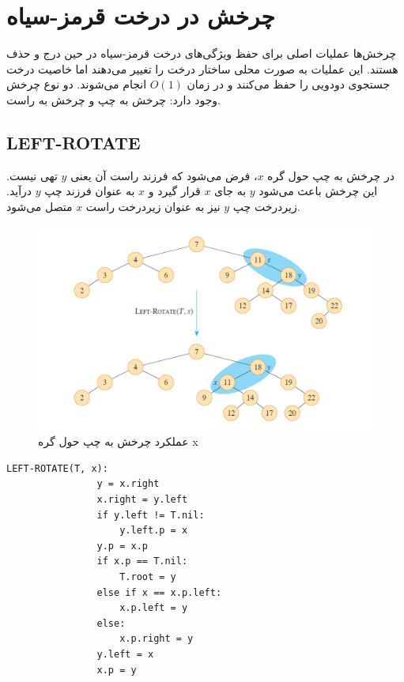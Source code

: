 \documentclass[a4paper,12pt]{article}
\begin{document}
	
	\section{چرخش در درخت قرمز-سیاه}
	چرخش‌ها عملیات اصلی برای حفظ ویژگی‌های درخت قرمز-سیاه در حین درج و حذف هستند. این عملیات به صورت محلی ساختار درخت را تغییر می‌دهند اما خاصیت درخت جستجوی دودویی را حفظ می‌کنند و در زمان \(O(1)\) انجام می‌شوند. دو نوع چرخش وجود دارد: چرخش به چپ و چرخش به راست.
	
	\subsection{LEFT-ROTATE}
	در چرخش به چپ حول گره \(x\)، فرض می‌شود که فرزند راست آن یعنی \(y\) تهی نیست. این چرخش باعث می‌شود \(y\) به جای \(x\) قرار گیرد و \(x\) به عنوان فرزند چپ \(y\) درآید. زیردرخت چپ \(y\) نیز به عنوان زیردرخت راست \(x\) متصل می‌شود.
	
	\begin{figure}[H]
		\centering
		 \includegraphics[width=1.2\textwidth]{img/left-rotation.png} %
		\caption{عملکرد چرخش به چپ حول گره x}
	\end{figure}
	
	\begin{LTR}
		\begin{lstlisting}[caption={Left Rotation Pseudocode}, label={lst:left-rotate}]
			LEFT-ROTATE(T, x):
				y = x.right
				x.right = y.left
				if y.left != T.nil:
					y.left.p = x
				y.p = x.p
				if x.p == T.nil:
					T.root = y
				else if x == x.p.left:
					x.p.left = y
				else:
					x.p.right = y
				y.left = x
				x.p = y
		\end{lstlisting}
	\end{LTR}
	
\end{document}
